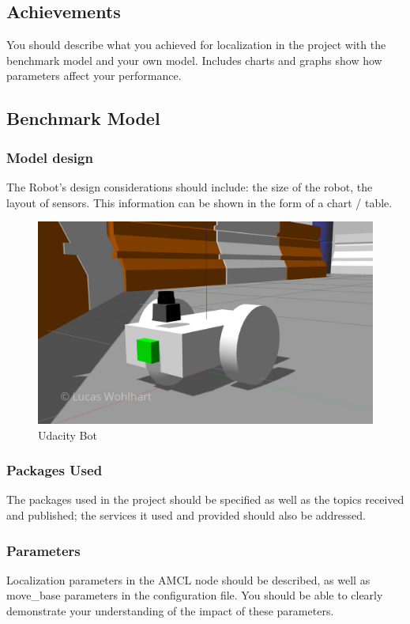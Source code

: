\documentclass[10pt,journal,compsoc]{IEEEtran}
\begin{document}
\subsection{Achievements}
You should describe what you achieved for localization in the project with the benchmark model and your own model. Includes charts and graphs show how parameters affect your performance. 

\subsection{Benchmark Model}
\subsubsection{Model design}
The Robot's design considerations should include: the size of the robot, the layout of sensors. This information can be shown in the form of a chart / table.

\begin{figure}[thpb]
      \centering
      \includegraphics[width=\linewidth]{img/udacity_bot}
      \caption{Udacity Bot}
      \label{fig:udacity_bot}
\end{figure}

\subsubsection{Packages Used}
The packages used in the project should be specified as well as the topics received and published; the services it used and provided should also be addressed. 

\subsubsection{Parameters}
Localization parameters in the AMCL node should be described, as well as move\_base parameters in the configuration file. You should be able to clearly demonstrate your understanding of the impact of these parameters.
\end{document}
